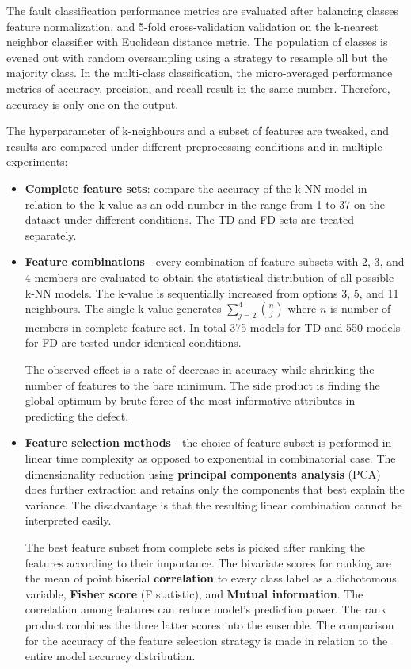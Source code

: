 The fault classification performance metrics are evaluated after balancing classes feature normalization, and 5-fold cross-validation validation on the k-nearest neighbor classifier with Euclidean distance metric. The population of classes is evened out with random oversampling using a strategy to resample all but the majority class. In the multi-class classification, the micro-averaged performance metrics of accuracy, precision, and recall result in the same number. Therefore, accuracy is only one on the output. 

The hyperparameter of k-neighbours and a subset of features are tweaked, and results are compared under different preprocessing conditions and in multiple experiments:

\begin{itemize}
\itemsep0pt
\item \textbf{Complete feature sets}: compare the accuracy of the k-NN model in relation to the k-value as an odd number in the range from 1 to 37 on the dataset under different conditions. The TD and FD sets are treated separately.

\item \textbf{Feature combinations} - every combination of feature subsets with 2, 3, and 4 members are evaluated to obtain the statistical distribution of all possible k-NN models. The k-value is sequentially increased from options 3, 5, and 11 neighbours. The single k-value generates $\sum_{j=2}^{4}{\binom{n}{j}}$ where $n$ is number of members in complete feature set. In total 375 models for TD and 550 models for FD are tested under identical conditions. 

The observed effect is a rate of decrease in accuracy while shrinking the number of features to the bare minimum. The side product is finding the global optimum by brute force of the most informative attributes in predicting the defect.

\item \textbf{Feature selection methods} - the choice of feature subset is performed in linear time complexity as opposed to exponential in combinatorial case. The dimensionality reduction using \textbf{principal components analysis} (PCA) does further extraction and retains only the components that best explain the variance. The disadvantage is that the resulting linear combination cannot be interpreted easily. 

The best feature subset from complete sets is picked after ranking the features according to their importance. The bivariate scores for ranking are the mean of point biserial \textbf{correlation} to every class label as a dichotomous variable, \textbf{Fisher score} (F statistic), and \textbf{Mutual information}. The correlation among features can reduce model's prediction power. The rank product combines the three latter scores into the ensemble. The comparison for the accuracy of the feature selection strategy is made in relation to the entire model accuracy distribution. 


\end{itemize}
